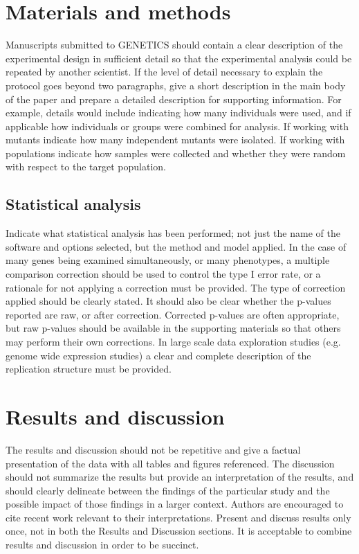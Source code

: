 \documentclass[9pt,twocolumn,twoside,lineno]{gsajnl}
\begin{document}
\section{Materials and methods}
\label{sec:materials:methods}

Manuscripts submitted to GENETICS should contain a clear description of the experimental design in sufficient detail so that the experimental analysis could be repeated by another scientist. If the level of detail necessary to explain the protocol goes beyond two paragraphs, give a short description in the main body of the paper and prepare a detailed description for supporting information.  For example, details would include indicating how many individuals were used, and if applicable how individuals or groups were combined for analysis. If working with mutants indicate how many independent mutants were isolated. If working with populations indicate how samples were collected and whether they were random with respect to the target population.


\subsection{Statistical analysis}

Indicate what statistical analysis has been performed; not just the name of the software and options selected, but the method and model applied. In the case of many genes being examined simultaneously, or many phenotypes, a multiple comparison correction should be used to control the type I error rate, or a rationale for not applying a correction must be provided. The type of correction applied should be clearly stated. It should also be clear whether the p-values reported are raw, or after correction. Corrected p-values are often appropriate, but raw p-values should be available in the supporting materials so that others may perform their own corrections. In large scale data exploration studies (e.g. genome wide expression studies) a clear and complete description of the replication structure must be provided.

\section{Results and discussion}

The results and discussion should not be repetitive and give a factual presentation of the data with all tables and figures referenced. The discussion should not summarize the results but provide an interpretation of the results, and should clearly delineate between the findings of the particular study and the possible impact of those findings in a larger context. Authors are encouraged to cite recent work relevant to their interpretations. Present and discuss results only once, not in both the Results and Discussion sections. It is acceptable to combine results and discussion in order to be succinct.
\end{document}
